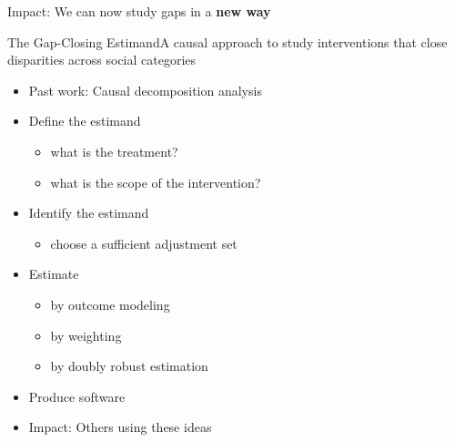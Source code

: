 \documentclass{beamer}
\newcommand\bblue[1]{{\color{blue}\textbf{#1}}}
\newcommand\E{\text{E}}
\begin{document}
{\begin{frame}{Impact: We can now study gaps in a \bblue{new way}}
\end{frame}

\begin{frame}{The Gap-Closing Estimand}{A causal approach to study interventions that close disparities across social categories}
	\begin{itemize}
		\item Past work: Causal decomposition analysis
		\item Define the estimand
		\begin{itemize}
			\item what is the treatment?
			\item what is the scope of the intervention?
		\end{itemize}
		\item Identify the estimand
		\begin{itemize}
			\item choose a sufficient adjustment set
		\end{itemize}
		\item Estimate
		\begin{itemize}
			\item by outcome modeling
			\item by weighting
			\item by doubly robust estimation
		\end{itemize}
		\item Produce software
		\item Impact: Others using these ideas
	\end{itemize}

\end{frame}


}
\end{document}
